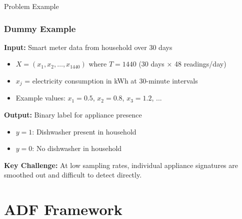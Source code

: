 \documentclass{beamer}
\begin{document}
\begin{frame}{Problem Example}
\frametitle{Dummy Example}

\textbf{Input:} Smart meter data from household over 30 days
\begin{itemize}
    \item $X = (x_1, x_2, \ldots, x_{1440})$ where $T = 1440$ (30 days × 48 readings/day)
    \item $x_j$ = electricity consumption in kWh at 30-minute intervals
    \item Example values: $x_1 = 0.5$, $x_2 = 0.8$, $x_3 = 1.2$, ...
\end{itemize}

\vspace{0.3cm}

\textbf{Output:} Binary label for appliance presence
\begin{itemize}
    \item $y = 1$: Dishwasher present in household
    \item $y = 0$: No dishwasher in household
\end{itemize}

\vspace{0.3cm}

\textbf{Key Challenge:} At low sampling rates, individual appliance signatures are smoothed out and difficult to detect directly.
\end{frame}

\section{ADF Framework}
\end{document}
